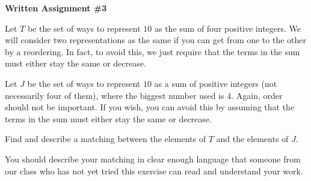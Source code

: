 \documentclass[12pt,letterpaper]{article}
\begin{document}
\setlength{\parskip}{1ex plus 0.5ex minus 0.2ex}
\setlength{\parindent}{0pt}

\pagestyle{fancy}
\lfoot{}
\rfoot{}

\begin{center}
{
\Large
\textbf{Written Assignment \#3}
}
\end{center}

Let $T$ be the set of ways to represent $10$ as the sum of four positive integers. 
We will consider two representations as the same if you can get from one to the other by  a reordering. 
In fact, to avoid this, we just require that the terms in the sum must either stay the same or decrease.

Let $J$ be the set of ways to represent $10$ as a sum of positive integers (not necessarily four of them), where the biggest number used is $4$.
Again, order should not be important.
If you wish, you can avoid this by assuming that the terms in the sum must either stay the same or decrease.

Find and describe a matching between the elements of $T$ and the elements of $J$.

You should describe your matching in clear enough language that someone from our class who has not yet tried this exercise can read and understand your work.
\end{document}
